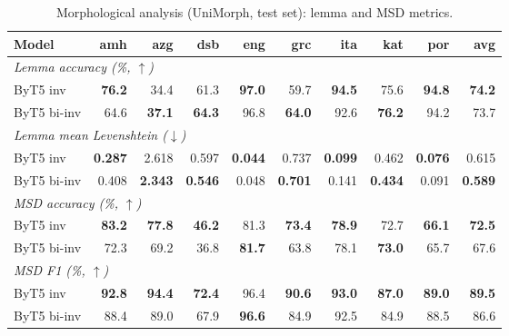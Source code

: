 \begin{table}[h]
\centering
\small
\setlength{\tabcolsep}{5pt}
\renewcommand{\arraystretch}{1.10}
\begin{tabular}{lrrrrrrrrr}
\toprule
Model & amh & azg & dsb & eng & grc & ita & kat & por & avg \\
\midrule
\multicolumn{10}{l}{\textit{Lemma accuracy (\%, $\uparrow$)}} \\
ByT5 inv & \textbf{76.2} & 34.4 & 61.3 & \textbf{97.0} & 59.7 & \textbf{94.5} & 75.6 & \textbf{94.8} & \textbf{74.2} \\
ByT5 bi-inv & 64.6 & \textbf{37.1} & \textbf{64.3} & 96.8 & \textbf{64.0} & 92.6 & \textbf{76.2} & 94.2 & 73.7 \\
\midrule
\multicolumn{10}{l}{\textit{Lemma mean Levenshtein ($\downarrow$)}} \\
ByT5 inv & \textbf{0.287} & 2.618 & 0.597 & \textbf{0.044} & 0.737 & \textbf{0.099} & 0.462 & \textbf{0.076} & 0.615 \\
ByT5 bi-inv & 0.408 & \textbf{2.343} & \textbf{0.546} & 0.048 & \textbf{0.701} & 0.141 & \textbf{0.434} & 0.091 & \textbf{0.589} \\
\midrule
\multicolumn{10}{l}{\textit{\acs{MSD} accuracy (\%, $\uparrow$)}} \\
ByT5 inv & \textbf{83.2} & \textbf{77.8} & \textbf{46.2} & 81.3 & \textbf{73.4} & \textbf{78.9} & 72.7 & \textbf{66.1} & \textbf{72.5} \\
ByT5 bi-inv & 72.3 & 69.2 & 36.8 & \textbf{81.7} & 63.8 & 78.1 & \textbf{73.0} & 65.7 & 67.6 \\
\midrule
\multicolumn{10}{l}{\textit{\acs{MSD} F1 (\%, $\uparrow$)}} \\
ByT5 inv & \textbf{92.8} & \textbf{94.4} & \textbf{72.4} & 96.4 & \textbf{90.6} & \textbf{93.0} & \textbf{87.0} & \textbf{89.0} & \textbf{89.5} \\
ByT5 bi-inv & 88.4 & 89.0 & 67.9 & \textbf{96.6} & 84.9 & 92.5 & 84.9 & 88.5 & 86.6 \\
\bottomrule
\end{tabular}
\caption{Morphological analysis (UniMorph, test set): lemma and \acs{MSD} metrics.}
\label{tab:results-analysis-um-matrix}
\end{table}
